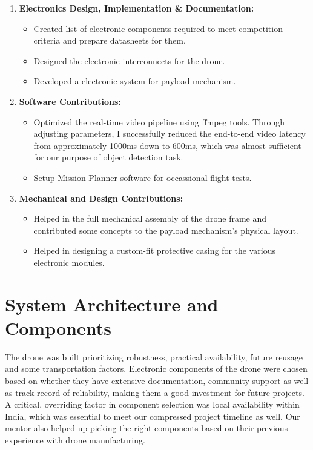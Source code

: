\noindent
\begin{enumerate}
	\item \textbf{Electronics Design, Implementation \& Documentation:}
	      \begin{itemize}
		      \item Created list of electronic components required to meet competition criteria and prepare datasheets for them.
		      \item Designed the electronic interconnects for the drone.
		      \item Developed a electronic system for payload mechanism.
	      \end{itemize}
	\item  \textbf{Software Contributions:}
	      \begin{itemize}
		      \item Optimized the real-time video pipeline using ffmpeg tools. Through adjusting parameters, I successfully reduced the end-to-end video latency from approximately 1000ms down to 600ms, which was almost sufficient for our purpose of object detection task.
		      \item Setup Mission Planner software for occassional flight tests.
	      \end{itemize}
	\item \textbf{Mechanical and Design Contributions:}
	      \begin{itemize}
		      \item Helped in the full mechanical assembly of the drone frame and contributed some concepts to the payload mechanism's physical layout.
		      \item Helped in designing a custom-fit protective casing for the various electronic modules.
	      \end{itemize}
\end{enumerate}

\raggedbottom
\chapter{System Architecture and Components}
The drone was built prioritizing robustness, practical availability, future reusage and some transportation factors.
Electronic components of the drone were chosen based on whether they have extensive documentation, community support as well as track record of reliability, making them a good investment for future projects.
A critical, overriding factor in component selection was local availability within India, which was essential to meet our compressed project timeline as well.
Our mentor also helped up picking the right components based on their previous experience with drone manufacturing.

